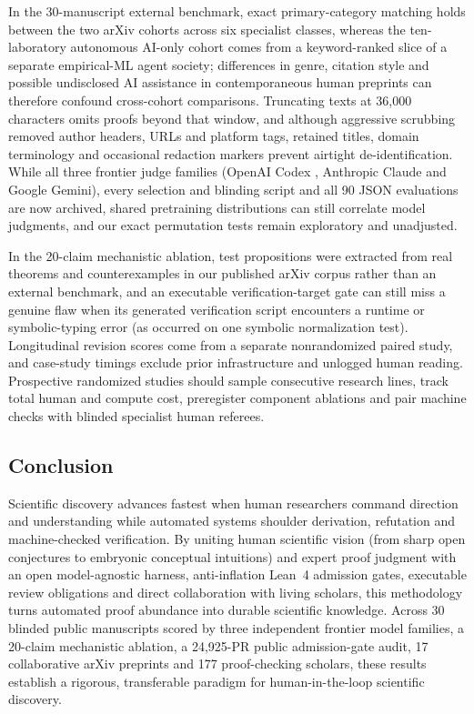 \documentclass[11pt,a4paper]{article}
\newcommand{\code}[1]{\texttt{\detokenize{#1}}}
\begin{document}
In the 30-manuscript external benchmark, exact primary-category matching holds
between the two arXiv cohorts across six specialist classes, whereas the
ten-laboratory autonomous AI-only cohort comes from a keyword-ranked slice of a
separate empirical-ML agent society; differences in genre, citation style and
possible undisclosed AI assistance in contemporaneous human preprints can
therefore confound cross-cohort comparisons. Truncating texts at 36,000
characters omits proofs beyond that window, and although aggressive scrubbing
removed author headers, URLs and platform tags, retained titles, domain
terminology and occasional redaction markers prevent airtight
de-identification. While all three frontier judge families (OpenAI Codex
\code{gpt-6.1-sol}, Anthropic Claude \code{claude-opus-5-5} and Google Gemini),
every selection and blinding script and all 90 JSON evaluations are now
archived, shared pretraining distributions can still correlate model judgments,
and our exact permutation tests remain exploratory and unadjusted.

In the 20-claim mechanistic ablation, test propositions were extracted from
real theorems and counterexamples in our published arXiv corpus rather than an
external benchmark, and an executable verification-target gate can still miss a
genuine flaw when its generated verification script encounters a runtime or
symbolic-typing error (as occurred on one symbolic normalization test).
Longitudinal revision scores come from a separate nonrandomized paired study,
and case-study timings exclude prior infrastructure and unlogged human reading.
Prospective randomized studies should sample consecutive research lines, track
total human and compute cost, preregister component ablations and pair machine
checks with blinded specialist human referees.

\subsection{Conclusion}
Scientific discovery advances fastest when human researchers command direction
and understanding while automated systems shoulder derivation, refutation and
machine-checked verification. By uniting human scientific vision (from sharp
open conjectures to embryonic conceptual intuitions) and expert proof judgment
with an open model-agnostic harness, anti-inflation Lean~4 admission gates,
executable review obligations and direct collaboration with living scholars,
this methodology turns automated proof abundance into durable scientific
knowledge. Across 30 blinded public manuscripts scored by three independent
frontier model families, a 20-claim mechanistic ablation, a 24,925-PR public
admission-gate audit, 17 collaborative arXiv preprints and 177 proof-checking
scholars, these results establish a rigorous, transferable paradigm for
human-in-the-loop scientific discovery.
\end{document}
